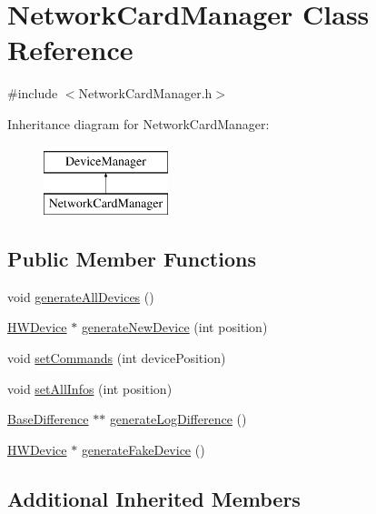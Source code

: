 \hypertarget{classNetworkCardManager}{}\section{Network\+Card\+Manager Class Reference}
\label{classNetworkCardManager}


{\ttfamily \#include $<$Network\+Card\+Manager.\+h$>$}

Inheritance diagram for Network\+Card\+Manager\+:\begin{figure}[H]
\begin{center}
\leavevmode
\includegraphics[height=2.000000cm]{classNetworkCardManager}
\end{center}
\end{figure}
\subsection*{Public Member Functions}
\begin{DoxyCompactItemize}
\item 
void \hyperlink{classNetworkCardManager_aa6a77a00f2366720ef0a4cbbe5c01a1d}{generate\+All\+Devices} ()
\item 
\hyperlink{classHWDevice}{H\+W\+Device} $\ast$ \hyperlink{classNetworkCardManager_a675dcf10689da520c3ab5ff32d066811}{generate\+New\+Device} (int position)
\item 
void \hyperlink{classNetworkCardManager_a9204cc788a83cafc73b2f798963417a2}{set\+Commands} (int device\+Position)
\item 
void \hyperlink{classNetworkCardManager_a880800c63daa416ec642691c0d85ca4a}{set\+All\+Infos} (int position)
\item 
\hyperlink{classBaseDifference}{Base\+Difference} $\ast$$\ast$ \hyperlink{classNetworkCardManager_a8dc8b4267433e57c6450fb7ebb0a43f6}{generate\+Log\+Difference} ()
\item 
\hyperlink{classHWDevice}{H\+W\+Device} $\ast$ \hyperlink{classNetworkCardManager_a473a9578d17f85f125183a6c48f86eb8}{generate\+Fake\+Device} ()
\end{DoxyCompactItemize}
\subsection*{Additional Inherited Members}


